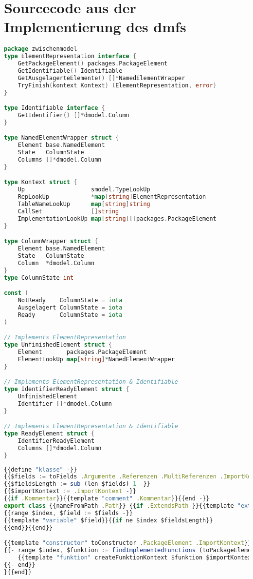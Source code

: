 \documentclass[./einleitung.tex]{subfiles}
\begin{document}
    \section{Sourcecode aus der Implementierung des \acrshort{dmf}s}\label{sec:dateien-aus-der-implementierung-des-dmfs}
    \begin{lstlisting}[language=Go, caption=Zwischenmodell für die Datenbankmodell-Generation ohne Implementierung der Methoden, label=zmodel]
package zwischenmodel
type ElementRepresentation interface {
	GetPackageElement() packages.PackageElement
	GetIdentifiable() Identifiable
	GetAusgelagerteElemente() []*NamedElementWrapper
	TryFinish(kontext Kontext) (ElementRepresentation, error)
}

type Identifiable interface {
	GetIdentifier() []*dmodel.Column
}

type NamedElementWrapper struct {
	Element base.NamedElement
	State   ColumnState
	Columns []*dmodel.Column
}

type Kontext struct {
	Up                   smodel.TypeLookUp
	RepLookUp            *map[string]ElementRepresentation
	TableNameLookUp      map[string]string
	CallSet              []string
	ImplementationLookUp map[string][]packages.PackageElement
}

type ColumnWrapper struct {
	Element base.NamedElement
	State   ColumnState
	Column  *dmodel.Column
}
type ColumnState int

const (
	NotReady    ColumnState = iota
	Ausgelagert ColumnState = iota
	Ready       ColumnState = iota
)

// Implements ElementRepresentation
type UnfinishedElement struct {
	Element       packages.PackageElement
	ElementLookUp map[string]*NamedElementWrapper
}

// Implements ElementRepresentation & Identifiable
type IdentifierReadyElement struct {
	UnfinishedElement
	Identifier []*dmodel.Column
}

// Implements ElementRepresentation & Identifiable
type ReadyElement struct {
	IdentifierReadyElement
	Columns []*dmodel.Column
}
    \end{lstlisting}
    \begin{lstlisting}[language=Typescript, caption=Template für die Generierung einer Typescript Klasse, label=lst:templateTsKlasse]
{{define "klasse" -}}
{{$fields := toFields .Argumente .Referenzen .MultiReferenzen .ImportKontext -}}
{{$fieldsLength := sub (len $fields) 1 -}}
{{$importKontext := .ImportKontext -}}
{{if .Kommentar}}{{template "comment" .Kommentar}}{{end -}}
export class {{nameFromPath .Path}} {{if .ExtendsPath }}{{template "extends" pathType .ExtendsPath .ImportKontext}}~\\~{{end}}{{if .ImplementsPaths}}{{template "implements" computeImplementNames .ImplementsPaths .ImportKontext}} {{end}}{
{{range $index, $field := $fields -}}
{{template "variable" $field}}{{if ne $index $fieldsLength}}
{{end}}{{end}}

{{template "constructor" toConstructor .PackageElement .ImportKontext}}
{{- range $index, $funktion := findImplementedFunctions (toPackageElement .EntityElement) }}
    {{template "funktion" createFunktionKontext $funktion $importKontext}}
{{- end}}
}{{end}}
    \end{lstlisting}
\end{document}
